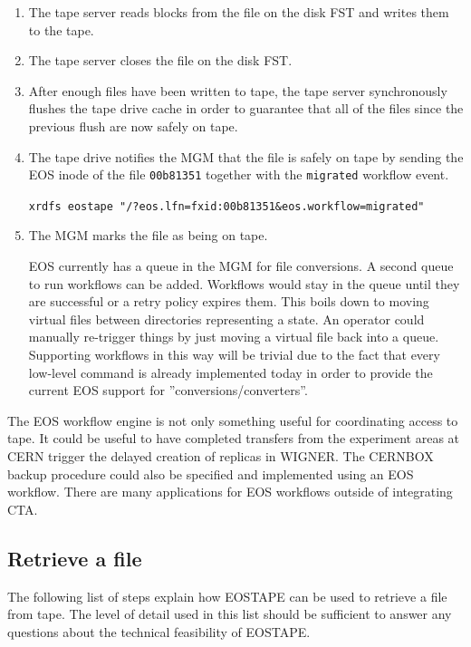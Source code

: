 \documentclass{article}
\begin{document}
\begin{enumerate}
\item The tape server reads blocks from the file on the disk FST and writes them to the tape.

\item The tape server closes the file on the disk FST.

\item After enough files have been written to tape, the tape server synchronously flushes the tape drive cache in order to guarantee that all of the files since the previous flush are now safely on tape.

\item The tape drive notifies the MGM that the file is safely on tape by sending the EOS inode of the file \texttt{00b81351} together with the \texttt{migrated} workflow event.

\texttt{xrdfs eostape "/?eos.lfn=fxid:00b81351\&eos.workflow=migrated"}

\item The MGM marks the file as being on tape.

EOS currently has a queue in the MGM for file conversions.  A second queue to run workflows can be added. Workflows would stay in the queue until they are successful or a retry policy expires them. This boils down to moving virtual files between directories representing a state.  An operator could manually re-trigger things by just moving a virtual file back into a queue. Supporting workflows in  this way will be trivial due to the fact that every low-level command is already implemented today in order to provide the current EOS support for ''conversions/converters''.

\end{enumerate}

The EOS workflow engine is not only something useful for coordinating access to tape. It could be useful to have completed transfers from the experiment areas at CERN trigger the delayed creation of replicas in WIGNER. The CERNBOX backup procedure could also be specified and implemented using an EOS workflow. There are many applications for EOS workflows outside of integrating CTA.

\newpage
\subsection{Retrieve a file}
The following list of steps explain how EOSTAPE can be used to retrieve a file from tape.  The level of detail used in this list should be sufficient to answer any questions about the technical feasibility of EOSTAPE. 
\end{document}
